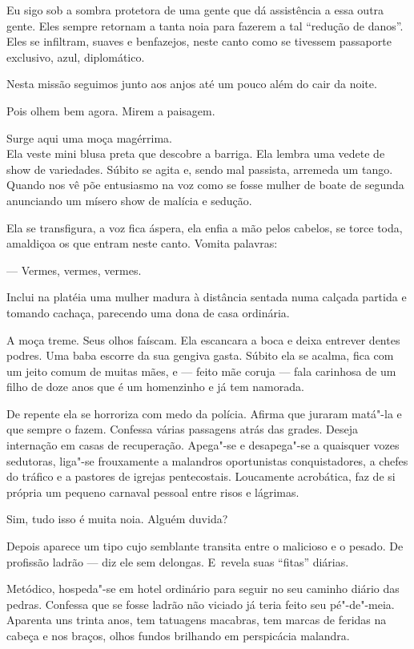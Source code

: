 Eu sigo sob a sombra protetora de uma gente que dá assistência a essa
outra gente. Eles sempre retornam a tanta noia para fazerem a tal
``redução de danos''. Eles se infiltram, suaves e benfazejos, neste
canto como se tivessem passaporte exclusivo, azul, diplomático.

Nesta missão seguimos junto aos anjos até um pouco além do cair da
noite.

\asterisc{}

Pois olhem bem agora. Mirem a paisagem.

Surge aqui uma moça magérrima.\\ Ela veste mini blusa preta que descobre
a barriga. Ela lembra uma vedete de show de variedades. Súbito se agita
e, sendo mal passista, arremeda um tango. Quando nos vê põe entusiasmo
na voz como se fosse mulher de boate de segunda anunciando um mísero
show de malícia e sedução.

Ela se transfigura, a voz fica áspera, ela enfia a mão pelos cabelos, se
torce toda, amaldiçoa os que entram neste canto. Vomita palavras:

— Vermes, vermes, vermes.

Inclui na platéia uma mulher madura à distância sentada numa calçada
partida e tomando cachaça, parecendo uma dona de casa ordinária.

A moça treme. Seus olhos faíscam. Ela escancara a boca e deixa entrever
dentes podres. Uma baba escorre da sua gengiva gasta. Súbito ela se
acalma, fica com um jeito comum de muitas mães, e --- feito mãe coruja
--- fala carinhosa de um filho de doze anos que é um homenzinho e já tem
namorada.

De repente ela se horroriza com medo da polícia. Afirma que juraram
matá"-la e que sempre o fazem. Confessa várias passagens atrás das
grades. Deseja internação em casas de recuperação. Apega"-se e
desapega"-se a quaisquer vozes sedutoras, liga"-se frouxamente a malandros
oportunistas conquistadores, a chefes do tráfico e a pastores de igrejas
pentecostais. Loucamente acrobática, faz de si própria um pequeno
carnaval pessoal entre risos e lágrimas.

Sim, tudo isso é muita noia. Alguém duvida?

\asterisc{}

Depois aparece um tipo cujo semblante transita entre o malicioso e o
pesado. De profissão ladrão --- diz ele sem delongas. E~revela suas
``fitas'' diárias.

Metódico, hospeda"-se em hotel ordinário para seguir no seu caminho
diário das pedras. Confessa que se fosse ladrão não viciado já teria
feito seu pé"-de"-meia. Aparenta uns trinta anos, tem tatuagens macabras,
tem marcas de feridas na cabeça e nos braços, olhos fundos brilhando em
perspicácia malandra.

